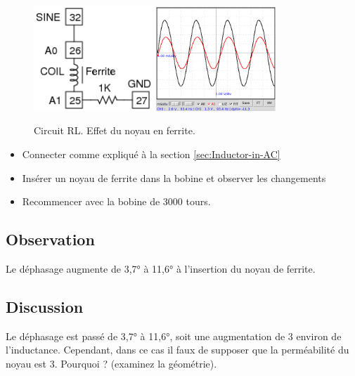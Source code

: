 \documentclass{book}
\begin{document}
\begin{figure}[h!]
\begin{center}
\caption{\label{fig:Ferrite-LR-screen}Circuit RL. Effet du noyau en ferrite. }\vspace{0.5em}
\includegraphics[width=0.4\textwidth, height=0.3\textwidth, keepaspectratio]{Schematic-rl-steadystate-ferrite.png}
\includegraphics[width=0.4\textwidth, height=0.3\textwidth, keepaspectratio]{Pic-LRphaseshift-ferrite.png}
\end{center}
\end{figure}



\begin{itemize}
  \item Connecter comme expliqué à la section  \ref{sec:Inductor-in-AC}
  \item Insérer un noyau de ferrite dans la bobine et observer les changements
  \item Recommencer avec la bobine de 3000 tours.
\end{itemize}

\subsection{Observation}


Le déphasage augmente de 3,7° à 11,6° à l'insertion du noyau de ferrite.

\subsection{Discussion}


Le déphasage est passé de 3,7° à 11,6°, soit une augmentation de 3 environ de l'inductance. Cependant, dans ce cas il faux de supposer que la perméabilité du noyau est 3. Pourquoi ? (examinez la géométrie).
\end{document}
